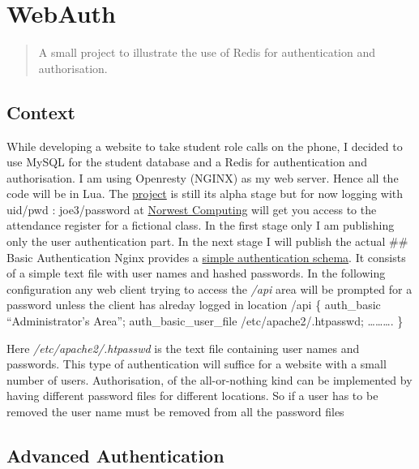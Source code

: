 \hypertarget{webauth}{%
\section{WebAuth}\label{webauth}}

\begin{quote}
A small project to illustrate the use of Redis for authentication and
authorisation.
\end{quote}

\hypertarget{context}{%
\subsection{Context}\label{context}}

While developing a website to take student role calls on the phone, I
decided to use MySQL for the student database and a Redis for
authentication and authorisation. I am using Openresty (NGINX) as my web
server. Hence all the code will be in Lua. The
\href{https://github.com/theSundayProgrammer/WebAuth}{project} is still
its alpha stage but for now logging with uid/pwd : joe3/password at
\href{https://test.norwestcomputing.com.au/new_class}{Norwest Computing}
will get you access to the attendance register for a fictional class. In
the first stage only I am publishing only the user authentication part.
In the next stage I will publish the actual \#\# Basic Authentication
Nginx provides a
\href{https://docs.nginx.com/nginx/admin-guide/security-controls/configuring-http-basic-authentication/}{simple
authentication schema}. It consists of a simple text file with user
names and hashed passwords. In the following configuration any web
client trying to access the \emph{/api} area will be prompted for a
password unless the client has alreday logged in location /api \{
auth\_basic ``Administrator's Area''; auth\_basic\_user\_file
/etc/apache2/.htpasswd; \ldots{}\ldots{}\ldots{}. \}

Here \emph{/etc/apache2/.htpasswd} is the text file containing user
names and passwords. This type of authentication will suffice for a
website with a small number of users. Authorisation, of the
all-or-nothing kind can be implemented by having different password
files for different locations. So if a user has to be removed the user
name must be removed from all the password files

\hypertarget{advanced-authentication}{%
\subsection{Advanced Authentication}\label{advanced-authentication}}

